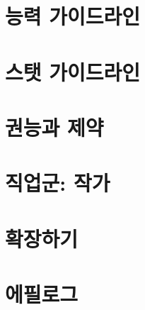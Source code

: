 \documentclass{report}
\begin{document}
	\hypertarget{ability-guidelines}{}
	\chapter{능력 가이드라인}
		
	
	\chapter{스탯 가이드라인}
		
	
	\hypertarget{power-limit}{}
	\chapter{권능과 제약}
		
	
	\hypertarget{author}{}
	\chapter{직업군: 작가}
		
	
	\hypertarget{expand}{}
	\chapter{확장하기}
		
	
	\chapter{에필로그}
		
\end{document}
